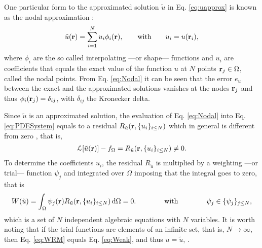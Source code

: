      One particular form to the approximated solution $\tilde{u}$ in Eq. \eqref{eq:uapprox} is known as the nodal approximation \cite{dhatt_finite_2012, fletcher_computational_1984}:
     \begin{align}
        \tilde{u}(\vb{r}) = \sum_{i = 1}^N u_i \phi_i(\vb{r}),
            \qquad
            \text{with}
            \qquad
        u_i = u(\vb{r}_i),
     \label{eq:Nodal}
     \end{align}
     where  $\phi_i$ are the so called interpolating ---or shape--- functions and $u_i$ are coefficients that equals the exact value of the function $u$ at $N$ points $\vb{r}_j \in \Omega$, called the nodal points. From Eq. \eqref{eq:Nodal} it can be seen that the error $e_{u}$ between the exact and the approximated solutions vanishes at the nodes $\vb{r}_j$ and thus $\phi_i(\vb{r}_j) = \delta_{ij}$, with $\delta_{ij}$ the Kronecker delta.

      Since $\tilde{u}$ is an approximated solution, the evaluation of Eq. \eqref{eq:Nodal} into Eq. \eqref{eq:PDESystem} equals to a residual $  R_{\tilde{u}}(\vb{r},\{u_i\}_{i\leq N}) $ which in general is different from zero \cite{fletcher_computational_1984,larson_finite_2013}, that is,
     \begin{align}
         \mathcal{L}[\tilde{u}(\vb{r})] - {f}_\Omega = R_{\tilde{u}}(\vb{r},\{u_i\}_{i\leq N}) \neq 0.
     \label{eq:PDESystem-app}
     \end{align}
     To determine the coefficients $u_i$, the residual $R_{\tilde{u}}$ is multiplied by a weighting ---or trial--- function $\psi_j$ and integrated over $\Omega$ imposing that the integral goes to zero, that is
     \begin{align}
        W(\tilde{u}) = \int_\Omega \psi_j(\vb{r}) R_{\tilde{u}}(\vb{r},\{u_i\}_{i\leq N}) \dd{\Omega} = 0.
            \qquad\qquad
            \text{with}
            \qquad\qquad
        \psi_j \in \{\psi_j\}_{j\leq N},
     \label{eq:WRM}
     \end{align}
     which is a set of $N$ independent algebraic equations with $N$ variables.  It is worth noting that if the trial functions are elements of an infinite set, that is, $N \to \infty$, then Eq. \eqref{eq:WRM} equals Eq. \eqref{eq:Weak}, and thus $u = \tilde{u}$, \cite{dhatt_finite_2012}.

